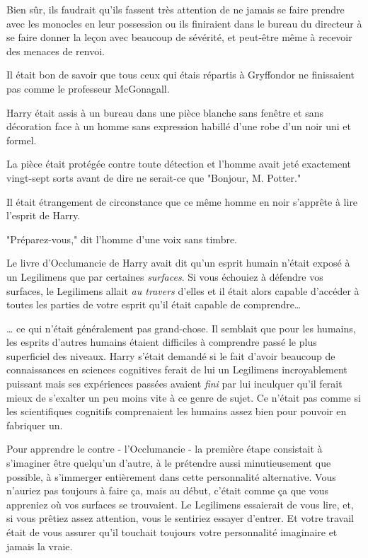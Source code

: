 Bien sûr, ils faudrait qu'ils fassent très attention de ne jamais se faire prendre avec les monocles en leur possession ou ils finiraient dans le bureau du directeur à se faire donner la leçon avec beaucoup de sévérité, et peut-être même à recevoir des menaces de renvoi.

Il était bon de savoir que tous ceux qui étais répartis à Gryffondor ne finissaient pas comme le professeur McGonagall.

\later

Harry était assis à un bureau dans une pièce blanche sans fenêtre et sans décoration face à un homme sans expression habillé d’une robe d'un noir uni et formel.

La pièce était protégée contre toute détection et l'homme avait jeté exactement vingt-sept sorts avant de dire ne serait-ce que "Bonjour, M. Potter."

Il était étrangement de circonstance que ce même homme en noir s'apprête à lire l'esprit de Harry.

"Préparez-vous," dit l'homme d'une voix sans timbre.

Le livre d'Occlumancie de Harry avait dit qu'un esprit humain n'était exposé à un Legilimens que par certaines \emph{surfaces}. Si vous échouiez à défendre vos surfaces, le Legilimens allait \emph{au travers} d'elles et il était alors capable d'accéder à toutes les parties de votre esprit qu'il était capable de comprendre…

… ce qui n'était généralement pas grand-chose. Il semblait que pour les humains, les esprits d'autres humains étaient difficiles à comprendre passé le plus superficiel des niveaux. Harry s'était demandé si le fait d'avoir beaucoup de connaissances en sciences cognitives ferait de lui un Legilimens incroyablement puissant mais ses expériences passées avaient \emph{fini} par lui inculquer qu'il ferait mieux de s'exalter un peu moins vite à ce genre de sujet. Ce n'était pas comme si les scientifiques cognitifs comprenaient les humains assez bien pour pouvoir en fabriquer un.

Pour apprendre le contre - l'Occlumancie - la première étape consistait à s'imaginer être quelqu'un d'autre, à le prétendre aussi minutieusement que possible, à s'immerger entièrement dans cette personnalité alternative. Vous n'auriez pas toujours à faire ça, mais au début, c'était comme ça que vous appreniez où vos surfaces se trouvaient. Le Legilimens essaierait de vous lire, et, si vous prêtiez assez attention, vous le sentiriez essayer d'entrer. Et votre travail était de vous assurer qu'il touchait toujours votre personnalité imaginaire et jamais la vraie.


